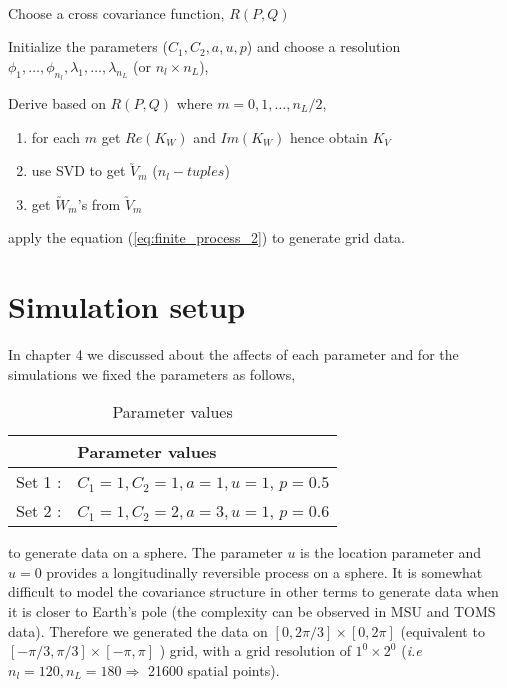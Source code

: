 	  \begin{algorithm} \label{pseudo_code}
	  \hfill \\
		\begin{itemize}
		\end{itemize}
	\end{algorithm}
	
	\section{Simulation setup}
	
In chapter 4 we discussed about the affects of each parameter and for the simulations we fixed the parameters as follows, 

\begin{table}[H]
\centering
\begin{tabular}{|l|l|}
 \hline
 & Parameter values\\ \hline
Set 1 : & $C_1 = 1, C_2 = 1, a = 1, u = 1$, $p=0.5$ \\
Set 2 : & $C_1 = 1, C_2 = 2, a = 3, u = 1$, $p=0.6$ \\ \hline 
\end{tabular}
\caption{Parameter values }
\end{table}

to generate data on a sphere. The parameter $u$ is the location parameter and $u=0$ provides a longitudinally reversible process on a sphere. It is somewhat difficult to model the covariance structure in other terms to generate data when it is closer to Earth's pole (the complexity can be observed in MSU and TOMS data). Therefore we generated the data on $[0,2\pi/3] \times [0,2\pi]$ (equivalent to $[-\pi/3,\pi/3] \times [-\pi,\pi]$ ) grid, with a grid resolution of $1^0\times 2^0$ ({\em i.e } $n_l = 120, n_L=180 \Rightarrow$ 21600 spatial points). 

